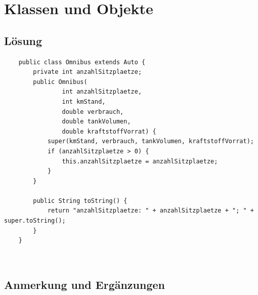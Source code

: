 \chapter{Klassen und Objekte}

\section{Lösung}


\begin{verbatim}
    public class Omnibus extends Auto {
        private int anzahlSitzplaetze;
        public Omnibus(
                int anzahlSitzplaetze,
                int kmStand,
                double verbrauch,
                double tankVolumen,
                double kraftstoffVorrat) {
            super(kmStand, verbrauch, tankVolumen, kraftstoffVorrat);
            if (anzahlSitzplaetze > 0) {
                this.anzahlSitzplaetze = anzahlSitzplaetze;
            }
        }

        public String toString() {
            return "anzahlSitzplaetze: " + anzahlSitzplaetze + "; " + super.toString();
        }
    }
\end{verbatim}\\

\section{Anmerkung und Ergänzungen}


